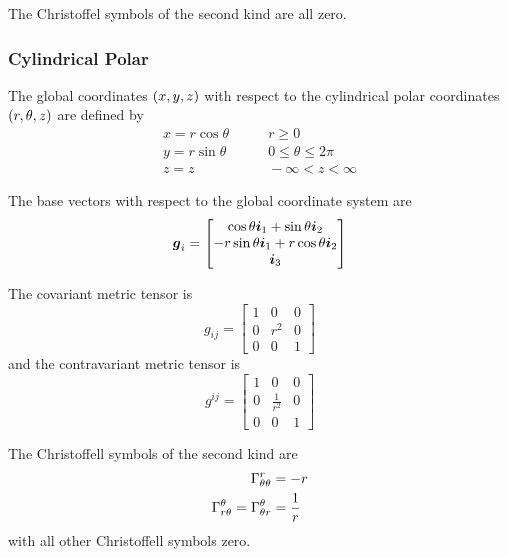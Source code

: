 The Christoffel symbols of the second kind are all zero.

\subsubsection{Cylindrical Polar}

The global coordinates  $\left( x,y,z \right)$ with respect to the cylindrical polar
coordinates $\left( r,\theta,z \right)$ are defined by
\begin{equation}
  \begin{aligned}
    x = r\cos\theta  & \qquad r \ge0 \\
    y = r\sin\theta & \qquad 0 \le\theta\le2\pi \\
    z = z          & \qquad -\infty < z < \infty
  \end{aligned}
\end{equation}

The base vectors with respect to the global coordinate system are
\begin{equation}
  \boldsymbol{g}_{i}=\begin{bmatrix} 
    \cos\theta\boldsymbol{i}_{1} + \sin\theta\boldsymbol{i}_{2} \\ 
    -r\sin\theta\boldsymbol{i}_{1}+ r\cos\theta\boldsymbol{i}_{2} \\
    \boldsymbol{i}_{3} 
  \end{bmatrix}
\end{equation}

The covariant metric tensor is
\begin{equation}
  g_{ij}=\begin{bmatrix}
    1 & 0 & 0 \\
    0 & r^{2} & 0 \\
    0 & 0 & 1
  \end{bmatrix}
\end{equation}
and the contravariant metric tensor is
\begin{equation}
  g^{ij}=\begin{bmatrix}
    1 & 0 & 0 \\
    0 & \frac{1}{r^{2}} & 0 \\
    0 & 0 & 1
  \end{bmatrix}
\end{equation}

The Christoffell symbols of the second kind are
\begin{align}
   \Gamma^{r}_{\theta\theta} &=-r \\
   \Gamma^{\theta}_{r\theta} = \Gamma^{\theta}_{\theta r} &=\frac{1}{r}
\end{align}
with all other Christoffell symbols zero.

